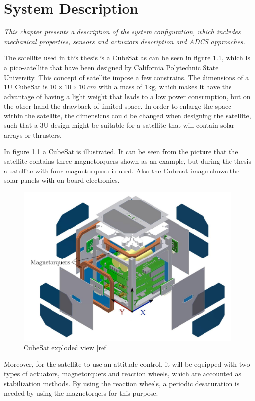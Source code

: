 \chapter{System Description}\label{chap:systemDescribtion}
\textit{This chapter presents a description of the system configuration, which includes mechanical properties, sensors and actuators description and ADCS approaches.}

The satellite used in this thesis is a CubeSat as can be seen in figure \ref{fig:cube}, which is a pico-satellite that have been designed by California Polytechnic State University. This concept of satellite impose a few constrains. The dimensions of a 1U CubeSat  is $10 \times 10 \times 10 \ cm$ with a mass of 1kg, which makes it have the advantage of having a light weight that leads to a low power consumption, but on the other hand the drawback of limited space. In order to enlarge the space within the satellite, the dimensions could be changed when designing the satellite, such that a 3U design might be suitable for a satellite that will contain solar arrays or thrusters.

In figure \ref{fig:cube} a CubeSat is illustrated. It can be seen from the picture that the satellite contains three magnetorquers shown as an example, but during the thesis a satellite with four magnetorquers is used. Also the Cubesat image shows the solar panels with on board electronics.

\begin{figure}[H]
	\centering
	\includegraphics[width=0.7\linewidth]{figures/cubesat}
	\caption{CubeSat exploded view [ref]}
	\label{fig:cube}
\end{figure}

Moreover, for the satellite to use an attitude control, it will be equipped with two types of actuators, magnetorquers and reaction wheels, which are accounted as stabilization methods. By using the reaction wheels, a periodic desaturation is needed by using the magnetorqers for this purpose.

